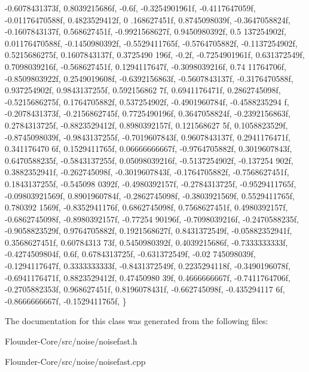 \begin{DoxyCode}
    -0.6078431373f, 0.8039215686f, -0.6f, -0.3254901961f, -0.4117647059f, -0.01176470588f, 0.4823529412f, 0
      .168627451f, 0.8745098039f, -0.3647058824f, -0.1607843137f, 0.568627451f, -0.9921568627f, 0.9450980392f, 0.5
      137254902f, 0.01176470588f,
    -0.1450980392f, -0.5529411765f, -0.5764705882f, -0.1137254902f, 0.5215686275f, 0.1607843137f, 0.3725490
      196f, -0.2f, -0.7254901961f, 0.631372549f, 0.7098039216f, -0.568627451f, 0.1294117647f, -0.3098039216f, 0.74
      11764706f, -0.8509803922f,
    0.2549019608f, -0.6392156863f, -0.5607843137f, -0.3176470588f, 0.937254902f, 0.9843137255f, 0.592156862
      7f, 0.6941176471f, 0.2862745098f, -0.5215686275f, 0.1764705882f, 0.537254902f, -0.4901960784f, -0.4588235294
      f, -0.2078431373f, -0.2156862745f,
    0.7725490196f, 0.3647058824f, -0.2392156863f, 0.2784313725f, -0.8823529412f, 0.8980392157f, 0.121568627
      5f, 0.1058823529f, -0.8745098039f, -0.9843137255f, -0.7019607843f, 0.9607843137f, 0.2941176471f, 0.341176470
      6f, 0.1529411765f, 0.06666666667f,
    -0.9764705882f, 0.3019607843f, 0.6470588235f, -0.5843137255f, 0.05098039216f, -0.5137254902f, -0.137254
      902f, 0.3882352941f, -0.262745098f, -0.3019607843f, -0.1764705882f, -0.7568627451f, 0.1843137255f, -0.545098
      0392f, -0.4980392157f, -0.2784313725f,
    -0.9529411765f, -0.09803921569f, 0.8901960784f, -0.2862745098f, -0.3803921569f, 0.5529411765f, 0.780392
      1569f, -0.8352941176f, 0.6862745098f, 0.7568627451f, 0.4980392157f, -0.6862745098f, -0.8980392157f, -0.77254
      90196f, -0.7098039216f, -0.2470588235f,
    -0.9058823529f, 0.9764705882f, 0.1921568627f, 0.8431372549f, -0.05882352941f, 0.3568627451f, 0.60784313
      73f, 0.5450980392f, 0.4039215686f, -0.7333333333f, -0.4274509804f, 0.6f, 0.6784313725f, -0.631372549f, -0.02
      745098039f, -0.1294117647f,
    0.3333333333f, -0.8431372549f, 0.2235294118f, -0.3490196078f, -0.6941176471f, 0.8823529412f, 0.47450980
      39f, 0.4666666667f, -0.7411764706f, -0.2705882353f, 0.968627451f, 0.8196078431f, -0.662745098f, -0.435294117
      6f, -0.8666666667f, -0.1529411765f,
\}
\end{DoxyCode}


The documentation for this class was generated from the following files\+:\begin{DoxyCompactItemize}
\item 
Flounder-\/\+Core/src/noise/noisefast.\+h\item 
Flounder-\/\+Core/src/noise/noisefast.\+cpp\end{DoxyCompactItemize}
